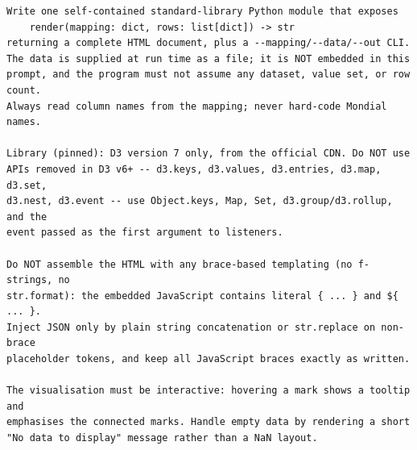 \begin{verbatim}
Write one self-contained standard-library Python module that exposes
    render(mapping: dict, rows: list[dict]) -> str
returning a complete HTML document, plus a --mapping/--data/--out CLI.
The data is supplied at run time as a file; it is NOT embedded in this
prompt, and the program must not assume any dataset, value set, or row count.
Always read column names from the mapping; never hard-code Mondial names.

Library (pinned): D3 version 7 only, from the official CDN. Do NOT use
APIs removed in D3 v6+ -- d3.keys, d3.values, d3.entries, d3.map, d3.set,
d3.nest, d3.event -- use Object.keys, Map, Set, d3.group/d3.rollup, and the
event passed as the first argument to listeners.

Do NOT assemble the HTML with any brace-based templating (no f-strings, no
str.format): the embedded JavaScript contains literal { ... } and ${ ... }.
Inject JSON only by plain string concatenation or str.replace on non-brace
placeholder tokens, and keep all JavaScript braces exactly as written.

The visualisation must be interactive: hovering a mark shows a tooltip and
emphasises the connected marks. Handle empty data by rendering a short
"No data to display" message rather than a NaN layout.
\end{verbatim}
